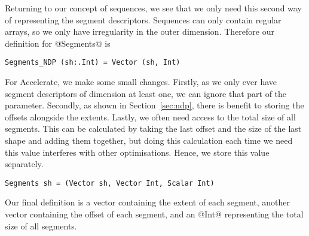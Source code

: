 Returning to our concept of sequences, we see that we only need this second way of representing the segment descriptors. Sequences can only contain regular arrays, so we only have irregularity in the outer dimension. Therefore our definition for @Segments@ is
%
\begin{lstlisting}[style=ndp]
Segments_NDP (sh:.Int) = Vector (sh, Int)
\end{lstlisting}
%
For Accelerate, we make some small changes. Firstly, as we only ever have segment descriptors of dimension at least one, we can ignore that part of the parameter. Secondly, as shown in Section~\ref{sec:ndp}, there is benefit to storing the offsets alongside the extents. Lastly, we often need access to the total size of all segments. This can be calculated by taking the last offset and the size of the last shape and adding them together, but doing this calculation each time we need this value interferes with other optimisations. Hence, we store this value separately.
%
\begin{lstlisting}[style=ndp]
Segments sh = (Vector sh, Vector Int, Scalar Int)
\end{lstlisting}
%
Our final definition is a vector containing the extent of each segment, another vector containing the offset of each segment, and an @Int@ representing the total size of all segments.




